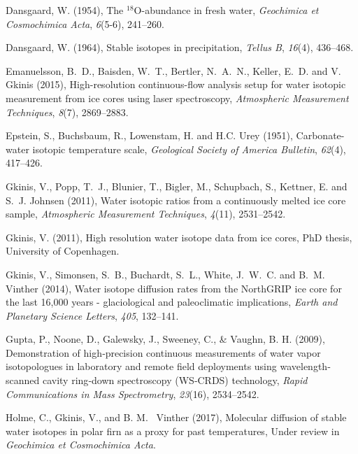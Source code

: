 \documentclass[draft, jgrga]{AGUTeX}
\begin{document}
\begin{article}
\begin{thebibliography}{}
 Dansgaard, W. (1954),
The $^{18}${O}-abundance in fresh water,
\textit{Geochimica et Cosmochimica Acta}, \textit{6}(5-6), 241--260.

 Dansgaard, W. (1964),
Stable isotopes in precipitation,
\textit{Tellus B}, \textit{16}(4), 436--468.

Emanuelsson, B.~D., Baisden, W.~T., Bertler, N.~A.~N., Keller, E.~D. and V. Gkinis (2015),
High-resolution continuous-flow analysis setup for water isotopic measurement from ice cores using laser spectroscopy,
\textit{Atmospheric Measurement Techniques}, \textit{8}(7), 2869--2883.

Epstein, S., Buchsbaum, R., Lowenstam, H. and H.C. Urey (1951),
Carbonate-water isotopic temperature scale,
\textit{Geological Society of America Bulletin}, \textit{62}(4), 417--426.

Gkinis, V., Popp, T.~J., Blunier, T., Bigler, M., Schupbach, S., Kettner, E. and S.~J. Johnsen (2011),
Water isotopic ratios from a continuously melted ice core sample,
\textit{Atmospheric Measurement Techniques}, \textit{4}(11), 2531--2542.

Gkinis, V. (2011),
{ High resolution water isotope data from ice cores},
PhD thesis, University of Copenhagen.

Gkinis, V., Simonsen, S.~B., Buchardt, S.~L., White, J.~W.~C. and  B.~M. Vinther (2014),
{Water isotope diffusion rates from the NorthGRIP ice core for the last 16,000 years - glaciological and paleoclimatic implications},
\textit{Earth and Planetary Science Letters}, \textit{405}, 132--141.

Gupta, P., Noone, D., Galewsky, J., Sweeney, C., \& Vaughn, B. H. (2009),
{Demonstration of high‐precision continuous measurements of water vapor isotopologues in laboratory and remote field deployments using wavelength‐scanned cavity ring‐down spectroscopy (WS‐CRDS) technology},
\textit{Rapid Communications in Mass Spectrometry}, \textit{23}(16), 2534--2542.

Holme, C., Gkinis, V., and B. M. ~Vinther (2017), Molecular
diffusion of stable water isotopes in polar firn as a proxy
for past temperatures, Under review in \textit{Geochimica et Cosmochimica Acta}.


\end{thebibliography}
\end{article}
\end{document}
